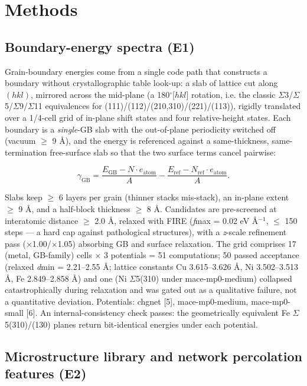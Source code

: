 \documentclass[preprint,12pt]{elsarticle}
\begin{document}
\section{Methods}

\subsection{Boundary-energy spectra (E1)}

Grain-boundary energies come from a single code path that constructs a boundary without crystallographic table look-up: a slab of lattice cut along $(hkl)$, mirrored across the mid-plane (a 180$^\circ$[$hkl$] rotation, i.e. the classic $\Sigma$3/$\Sigma$5/$\Sigma$9/$\Sigma$11 equivalences for (111)/(112)/(210,310)/(221)/(113)), rigidly translated over a 1/4-cell grid of in-plane shift states and four relative-height states. Each boundary is a \textit{single}-GB slab with the out-of-plane periodicity switched off (vacuum $\ge$ 9 \AA), and the energy is referenced against a same-thickness, same-termination free-surface slab so that the two surface terms cancel pairwise:

\[
\gamma_{\mathrm{GB}} = \frac{E_{\mathrm{GB}} - N\cdot e_{\mathrm{atom}}}{A} - \frac{E_{\mathrm{ref}} - N_{\mathrm{ref}}\cdot e_{\mathrm{atom}}}{A}.
\]

Slabs keep $\ge$ 6 layers per grain (thinner stacks mis-stack), an in-plane extent $\ge$ 9 \AA, and a half-block thickness $\ge$ 8 \AA. Candidates are pre-screened at interatomic distance $\ge$ 2.0 \AA, relaxed with FIRE (\textit{f}max = 0.02 eV \AA$^{-1}$, $\le$ 150 steps --- a hard cap against pathological structures), with a \textit{z}-scale refinement pass ($\times$1.00/$\times$1.05) absorbing GB and surface relaxation. The grid comprises 17 (metal, GB-family) cells $\times$ 3 potentials = 51 computations; 50 passed acceptance (relaxed \textit{d}min = 2.21--2.55 \AA; lattice constants Cu 3.615--3.626 \AA, Ni 3.502--3.513 \AA, Fe 2.849--2.858 \AA) and one (Ni $\Sigma$5(310) under mace-mp0-medium) collapsed catastrophically during relaxation and was gated out as a qualitative failure, not a quantitative deviation. Potentials: chgnet [5], mace-mp0-medium, mace-mp0-small [6]. An internal-consistency check passes: the geometrically equivalent Fe $\Sigma$5(310)/(130) planes return bit-identical energies under each potential.

\subsection{Microstructure library and network percolation features (E2)}
\end{document}
